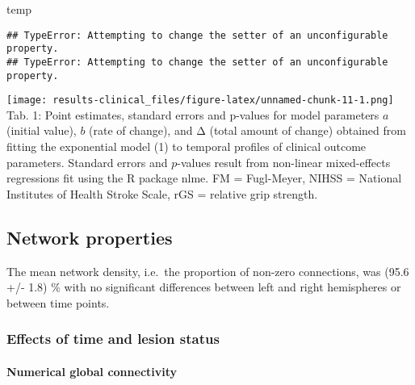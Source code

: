 \documentclass[]{article}
\newenvironment{Shaded}{\begin{snugshade}}{\end{snugshade}}
\newcommand{\NormalTok}[1]{#1}
\let\oldparagraph\paragraph
\renewcommand{\paragraph}[1]{\oldparagraph{#1}\mbox{}}
\begin{document}
\begin{Shaded}
\begin{Highlighting}[]
\NormalTok{temp}
\end{Highlighting}
\end{Shaded}

\begin{verbatim}
## TypeError: Attempting to change the setter of an unconfigurable property.
## TypeError: Attempting to change the setter of an unconfigurable property.
\end{verbatim}

\texttt{[image: results-clinical\_files/figure-latex/unnamed-chunk-11-1.png]}
Tab. 1: Point estimates, standard errors and p-values for model
parameters \(a\) (initial value), \(b\) (rate of change), and Δ (total
amount of change) obtained from fitting the exponential model (1) to
temporal profiles of clinical outcome parameters. Standard errors and
\(p\)-values result from non-linear mixed-effects regressions fit using
the R package nlme. FM = Fugl-Meyer, NIHSS = National Institutes of
Health Stroke Scale, rGS = relative grip strength.

\hypertarget{network-properties}{%
\subsection{Network properties}\label{network-properties}}

The mean network density, i.e.~the proportion of non-zero connections,
was (95.6 +/- 1.8) \% with no significant differences between left and
right hemispheres or between time points.

\hypertarget{effects-of-time-and-lesion-status}{%
\subsubsection{Effects of time and lesion
status}\label{effects-of-time-and-lesion-status}}

\hypertarget{numerical-global-connectivity}{%
\paragraph{Numerical global
connectivity}\label{numerical-global-connectivity}}
\end{document}
